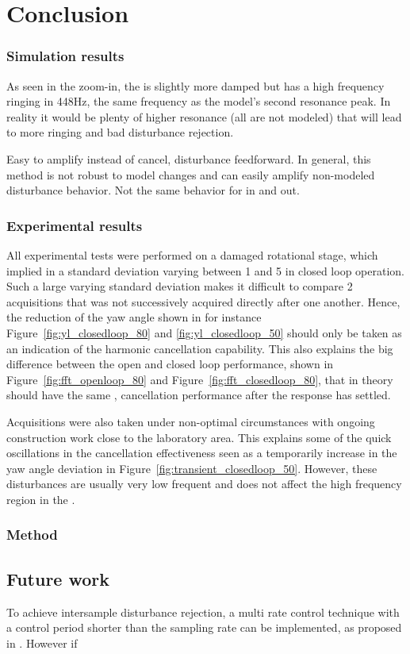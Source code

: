 \chapter{Conclusion}\label{cha:conclusion}


\subsection{Simulation results}
As seen in the zoom-in, the \abbrIRC is slightly more damped but has a high frequency ringing in 448Hz, the same frequency as the model's second resonance peak. In reality it would be plenty of  higher resonance (all are not modeled) that will lead to more ringing and bad disturbance rejection.

Easy to amplify instead of cancel, disturbance feedforward.  In general, this method is not robust to model changes and can easily amplify non-modeled disturbance behavior. Not the same behavior for in and out.

\subsection{Experimental results}
All experimental tests were performed on a damaged rotational stage, which implied in a standard deviation varying between \unit{1}{\micro\radian} and \unit{5}{\micro\radian} in closed loop operation. Such a large varying standard deviation makes it difficult to compare 2 acquisitions that was not successively acquired directly after one another. Hence, the reduction of the yaw angle shown in for instance Figure~\ref{fig:yl_closedloop_80} and \ref{fig:yl_closedloop_50} should only be taken as an indication of the harmonic cancellation capability. This also explains the big difference between the open and closed loop performance, shown in Figure~\ref{fig:fft_openloop_80} and Figure~\ref{fig:fft_closedloop_80}, that in theory should have the same , cancellation performance after the response has settled.

Acquisitions were also taken under non-optimal circumstances with ongoing construction work close to the laboratory area. This explains some of the quick oscillations in the cancellation effectiveness seen as a temporarily increase in the yaw angle deviation in Figure~\ref{fig:transient_closedloop_50}. However, these disturbances are usually very low frequent and does not affect the high frequency region in the \abbrFFT.

\subsection{Method}


\section{Future work}

To achieve intersample disturbance rejection, a multi rate control technique with a control period shorter than the sampling rate can be implemented, as proposed in \citep{fujimoto2009rro}. However if
